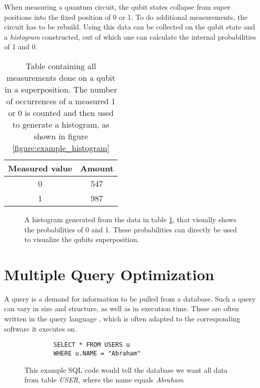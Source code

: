 When measuring a quantum circuit, the qubit states collapse from super positions into the fixed position of 0 or 1. To do additional measurements, the circuit has to be rebuild. Using this data can be collected on the qubit state and a \emph{histogram} constructed, out of which one can calculate the internal probabilities of 1 and 0.

\begin{table}[!h]
    \centering
    \begin{tabular}{|c|c|}
         Measured value & Amount  \\
         \hline
         0 & 547 \\
         1 & 987 \\
    \end{tabular}
    \caption{Table containing all measurements done on a qubit in a superposition. The number of occurrences of a measured 1 or 0 is counted and then used to generate a histogram, as shown in figure \ref{figure:example_histogram}}
    \label{table:example_counts}
\end{table}



\begin{figure}[!h]
    \centering
    \scalebox{0.75}{
        
    }
    \caption{A histogram generated from the data in table \ref{table:example_counts}, that visually shows the probabilities of 0 and 1. These probabilities can directly be used to visualize the qubits superposition.}
    \label{fig:example_histogram}
\end{figure}


\newpage

\section{Multiple Query Optimization}

A query\cite{codd_relational_1970} is a demand for information to be pulled from a database. Such a query can vary in size and structure, as well as in execution time. These are often written in the query language , which is often adapted to the corresponding software\cite{shirgoldbird_microsoft_nodate}\cite{the_postgresql_global_development_group_postgresql_2022} it executes on. 

    
\begin{figure}[!h]
    \centering
    \begin{verbatim}
        SELECT * FROM USERS u
        WHERE u.NAME = "Abraham"
    \end{verbatim}
    \caption{This example SQL code would tell the database we want all data from table \emph{USER}, where the name equals \emph{Abraham}}
    \label{figure:sql_query_example}
\end{figure}

